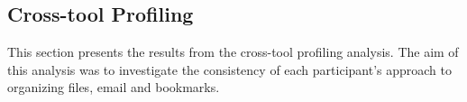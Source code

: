



\subsection{Cross-tool Profiling}
\label{exp-study:Results-cross-tool-profiling}

This section presents the results from the cross-tool profiling analysis.  The aim of this analysis was to investigate the consistency of each participant's approach to organizing files, email and bookmarks. %

